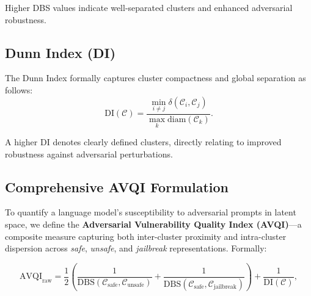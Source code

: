 Higher DBS values indicate well-separated clusters and enhanced adversarial robustness.





\subsection{Dunn Index (DI)}

The Dunn Index formally captures cluster compactness and global separation as follows:
\begin{equation*}
\mathrm{DI}(\mathcal{C}) = \frac{\min_{i \neq j}\delta(\mathcal{C}_i,\mathcal{C}_j)}{\max_k \mathrm{diam}(\mathcal{C}_k)}.
\end{equation*}

A higher DI denotes clearly defined clusters, directly relating to improved robustness against adversarial perturbations.

\subsection{Comprehensive \textsc{AVQI} Formulation}

To quantify a language model’s susceptibility to adversarial prompts in latent space, we define the \textbf{Adversarial Vulnerability Quality Index (AVQI)}—a composite measure capturing both inter-cluster proximity and intra-cluster dispersion across \textit{safe}, \textit{unsafe}, and \textit{jailbreak} representations. Formally:

\begin{equation*}
\mathrm{AVQI}_{\text{raw}} = \frac{1}{2}\left( 
\frac{1}{\mathrm{DBS}(\mathcal{C}_{\text{safe}}, \mathcal{C}_{\text{unsafe}})} +
\frac{1}{\mathrm{DBS}(\mathcal{C}_{\text{safe}}, \mathcal{C}_{\text{jailbreak}})}
\right)
+
\frac{1}{\mathrm{DI}(\mathcal{C})},
\end{equation*}

